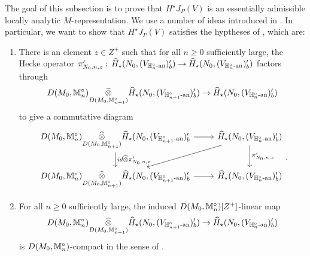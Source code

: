 \documentclass[10pt]{amsart}
\begin{document}
The goal of this subsection is to prove that $H^{\star}J_{P}(V)$ is an essentially admissible locally analytic $M$-representation. We use a number of ideas introduced in \cite{Jacquet1}. In particular, we want to show that $H^{\star}J_{P}(V)$ satisfies the hyptheses of \cite[Prop. 3.2.24]{Jacquet1}, which are: 
\begin{enumerate}
    \item There is an element $z\in Z^{+}$ such that for all $n\geq 0$ sufficiently large, the Hecke operator $\pi_{N_{0},n,z}^{\prime}:\, \widehat{H}_{\star}(N_{0},(V_{\mathbb{H}_{n}^{\circ}\textnormal{-an}})_{b}^{\prime}) \rightarrow \widehat{H}_{\star}(N_{0},(V_{\mathbb{H}_{n}^{\circ}\textnormal{-an}})_{b}^{\prime})$ factors through \begin{equation*}
        D(M_{0},\mathbb{M}_{n}^{\circ})\underset{D(M_{0},\mathbb{M}_{n+1}^{\circ})}{\widehat{\otimes}} \widehat{H}_{\star}(N_{0},(V_{\mathbb{H}_{n+1}^{\circ}\textnormal{-an}})_{b}^{\prime}) \rightarrow  \widehat{H}_{\star}(N_{0},(V_{\mathbb{H}_{n}^{\circ}\textnormal{-an}})_{b}^{\prime})
    \end{equation*} to give a commutative diagram \begin{equation*}
    \begin{tikzcd}	
        D(M_{0},\m_{n}^{\circ})\underset{D(M_{0},\m_{n+1}^{\circ})}{\widehat{\otimes}} \widehat{H}_{\star}(N_{0},(V_{\h_{n+1}^{\circ}\An})_{b}^{\prime} \arrow[r] \arrow[d,"id\widehat{\otimes} \pi_{N_{0},n,z}^{\prime}"] & \widehat{H}_{\star}(N_{0},(V_{\h_{n}^{\circ}\An})_{b}^{\prime}) \arrow[d,"\pi_{N_{0},n,z}^{\prime}"] \arrow[dl] \\ 
	    D(M_{0},\m_{n}^{\circ})\underset{D(M_{0},\m_{n+1}^{\circ})}{\widehat{\otimes}} \widehat{H}_{\star}(N_{0},(V_{\h_{n+1}^{\circ}\An})_{b}^{\prime} \arrow[r] & \widehat{H}_{\star}(N_{0},(V_{\h_{n}^{\circ}\An})_{b}^{\prime})
    \end{tikzcd}.
    \end{equation*}
    \item For all $n\geq 0$ sufficiently large, the induced $D(M_{0},\mathbb{M}_{n}^{\circ})[Z^{+}]$-linear map \begin{equation*}
        D(M_{0},\mathbb{M}_{n}^{\circ})\underset{D(M_{0},\mathbb{M}_{n+1}^{\circ})}{\widehat{\otimes}} \widehat{H}_{\star}(N_{0},(V_{\mathbb{H}_{n+1}^{\circ}\textnormal{-an}})_{b}^{\prime})\rightarrow \widehat{H}_{\star}(N_{0},(V_{\mathbb{H}_{n}^{\circ}\textnormal{-an}})_{b}^{\prime})
    \end{equation*} is $D(M_{0},\mathbb{M}_{n}^{\circ})$-compact in the sense of \cite[Def. 2.3.3]{Jacquet1}. 
\end{enumerate}
\end{document}
